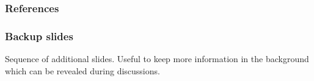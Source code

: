 \documentclass[t,english]{beamer}
\begin{document}

  

\appendix


\begin{frame}[allowframebreaks]
  \frametitle{References}
  \printbibliography[heading=none]
\end{frame}


\begin{frame}
  \frametitle{Backup slides}

  Sequence of additional slides. Useful to keep more information in the background which can be revealed during discussions.

\end{frame}
\end{document}
